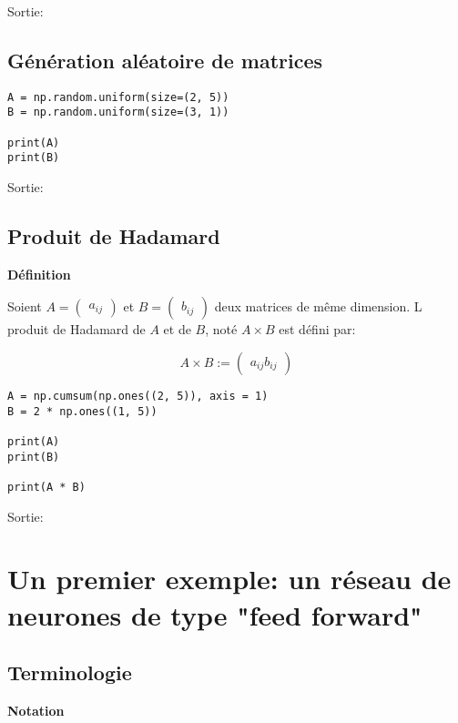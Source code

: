 \documentclass[11pt]{article}
\begin{document}
Sortie:

\subsection{Génération aléatoire de matrices}
\label{sec-3-3}

\begin{verbatim}
A = np.random.uniform(size=(2, 5))
B = np.random.uniform(size=(3, 1))

print(A)
print(B)
\end{verbatim}

Sortie:

\subsection{Produit de Hadamard}
\label{sec-3-4}

\textbf{Définition}

Soient $A=\begin{pmatrix}a_{ij}\end{pmatrix}$ et
$B=\begin{pmatrix}b_{ij}\end{pmatrix}$ deux matrices de même dimension. L
produit de Hadamard de $A$ et de $B$, noté $A\times B$ est défini par:

\begin{equation}
A\times B := \begin{pmatrix}a_{ij}b_{ij}\end{pmatrix}
\end{equation}

\begin{verbatim}
A = np.cumsum(np.ones((2, 5)), axis = 1)
B = 2 * np.ones((1, 5))

print(A)
print(B)

print(A * B)
\end{verbatim}

Sortie:


\section{Un premier exemple: un réseau de neurones de type "feed forward"}
\label{sec-4}

\subsection{Terminologie}
\label{sec-4-1}

\textbf{Notation}
\end{document}

